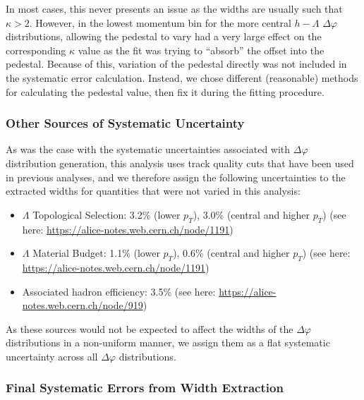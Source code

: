 \documentclass[ALICE,manyauthors]{ALICE_analysis_notes}
\begin{document}
In most cases, this never presents an issue as the widths are usually such that $\kappa > 2$. However, in the lowest momentum bin for the more central $h-\Lambda$ $\Delta\varphi$ distributions, allowing the pedestal to vary had a very large effect on the corresponding $\kappa$ value as the fit was trying to ``absorb'' the offset into the pedestal. Because of this, variation of the pedestal directly was not included in the systematic error calculation. Instead, we chose different (reasonable) methods for calculating the pedestal value, then fix it during the fitting procedure.

\subsubsection{Other Sources of Systematic Uncertainty}
\label{other_systematic_sources_width}
As was the case with the systematic uncertainties associated with $\Delta\varphi$ distribution generation, this analysis uses track quality cuts that have been used in previous analyses, and we therefore assign the following uncertainties to the extracted widths for quantities that were not varied in this analysis:

\begin{itemize}
\item $\Lambda$ Topological Selection: 3.2\% (lower $p_{T}$), 3.0\% (central and higher $p_{T}$) (see here: \url{https://alice-notes.web.cern.ch/node/1191})
\item $\Lambda$ Material Budget: 1.1\% (lower $p_{T}$), 0.6\% (central and higher $p_{T}$) (see here: \url{https://alice-notes.web.cern.ch/node/1191})
\item Associated hadron efficiency: 3.5\% (see here: \url{https://alice-notes.web.cern.ch/node/919})
\end{itemize}

As these sources would not be expected to affect the widths of the $\Delta\varphi$ distributions in a non-uniform manner, we assign them as a flat systematic uncertainty across all $\Delta\varphi$ distributions.


\subsubsection{Final Systematic Errors from Width Extraction}
\label{final_systematic_errors_width}
\end{document}

